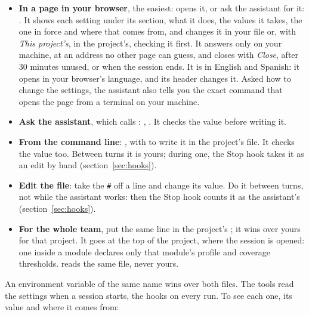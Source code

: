 \documentclass[11pt,a4paper]{article}
\begin{document}
\begin{itemize}
  \item \textbf{In a page in your browser}, the easiest:
        \allowbreak{}
        opens it, or ask the assistant for it: . It shows each setting under its section, what it does, the
        values it takes, the one in force and where that comes from, and
        changes it in your file or, with \emph{This project's}, in the
        project's, checking it first. It answers only on your machine, at an
        address no other page can guess, and closes with \emph{Close}, after 30
        minutes unused, or when the session ends. It is in English and
        Spanish: it opens in your browser's language, and its header changes
        it. Asked how to change the
        settings, the assistant also tells you the exact command that opens
        the page from a terminal on your machine.
  \item \textbf{Ask the assistant}, which calls :
        , . It checks the value before writing it.
  \item \textbf{From the command line}:
        ,
        with  to write it in the project's file. It checks the value too.
        Between turns it is yours; during one, the Stop hook takes it as an
        edit by hand (section~\ref{sec:hooks}).
  \item \textbf{Edit the file}: take the \texttt{\#} off a line and change its value.
        Do it between turns, not while the assistant works: then the Stop hook
        counts it as the assistant's (section~\ref{sec:hooks}).
  \item \textbf{For the whole team}, put the same line in the project's
        ; it wins over yours for that project.
        It goes at the top of the project, where the session is opened: one
        inside a module declares only that module's profile and coverage
        thresholds.  reads the same file, never yours.
\end{itemize}

An environment variable of the same name wins over both files. The tools read
the settings when a session starts, the hooks on every run. To see each one,
its value and where it comes from:
\end{document}
